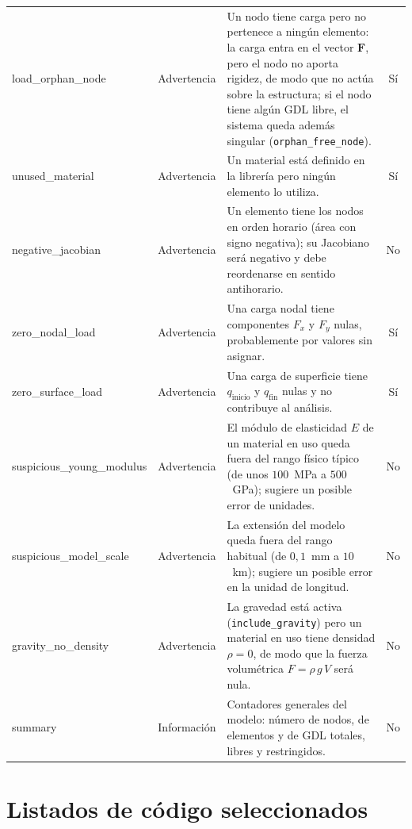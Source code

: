 \begin{longtable}{@{}>{\ttfamily\footnotesize}p{2.8cm} >{\footnotesize}l >{\footnotesize\raggedright\arraybackslash}p{5.4cm} >{\footnotesize}c@{}}
load\_orphan\_node & Advertencia & Un nodo tiene carga pero no pertenece a ningún elemento: la carga entra en el vector $\bm{F}$, pero el nodo no aporta rigidez, de modo que no actúa sobre la estructura; si el nodo tiene algún GDL libre, el sistema queda además singular (\texttt{orphan\_free\_node}). & Sí \\
\addlinespace
unused\_material & Advertencia & Un material está definido en la librería pero ningún elemento lo utiliza. & Sí \\
\addlinespace
negative\_jacobian & Advertencia & Un elemento tiene los nodos en orden horario (área con signo negativa); su Jacobiano será negativo y debe reordenarse en sentido antihorario. & No \\
\addlinespace
zero\_nodal\_load & Advertencia & Una carga nodal tiene componentes $F_x$ y $F_y$ nulas, probablemente por valores sin asignar. & Sí \\
\addlinespace
zero\_surface\_load & Advertencia & Una carga de superficie tiene $q_{\text{inicio}}$ y $q_{\text{fin}}$ nulas y no contribuye al análisis. & Sí \\
\addlinespace
suspicious\_young\_modulus & Advertencia & El módulo de elasticidad $E$ de un material en uso queda fuera del rango físico típico (de unos \mbox{$100$~MPa} a \mbox{$500$~GPa}); sugiere un posible error de unidades. & No \\
\addlinespace
suspicious\_model\_scale & Advertencia & La extensión del modelo queda fuera del rango habitual (de \mbox{$0{,}1$~mm} a \mbox{$10$~km}); sugiere un posible error en la unidad de longitud. & No \\
\addlinespace
gravity\_no\_density & Advertencia & La gravedad está activa (\texttt{include\_gravity}) pero un material en uso tiene densidad $\rho = 0$, de modo que la fuerza volumétrica $F = \rho\, g\, V$ será nula. & No \\
\midrule

summary & Información & Contadores generales del modelo: número de nodos, de elementos y de GDL totales, libres y restringidos. & No \\

\end{longtable}



\chapter{Listados de código seleccionados}
\label{anexo:codigo}

